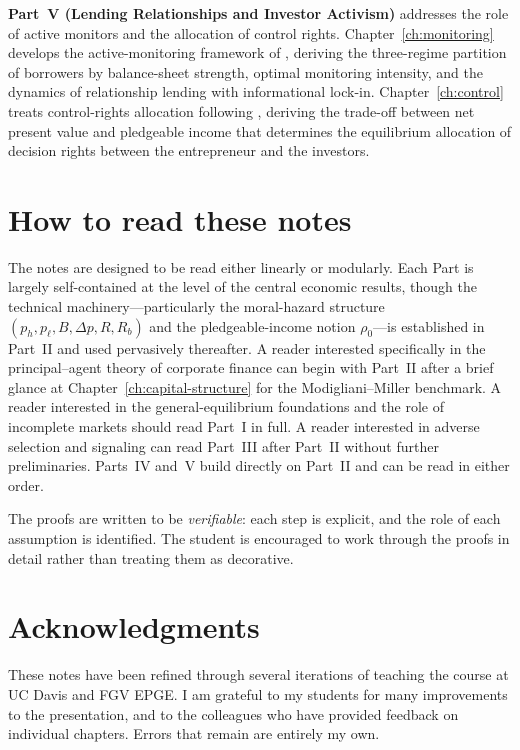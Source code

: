 \documentclass[11pt,a4paper,oneside]{book}
\theoremstyle{plain}
\theoremstyle{definition}
\theoremstyle{remark}
\numberwithin{equation}{chapter}
\begin{document}
\textbf{Part~V (Lending Relationships and Investor Activism)} addresses the role of active monitors and the allocation of control rights.
Chapter~\ref{ch:monitoring} develops the active-monitoring framework of \citet{HolmstromTirole1997}, deriving the three-regime partition of borrowers by balance-sheet strength, optimal monitoring intensity, and the dynamics of relationship lending with informational lock-in.
Chapter~\ref{ch:control} treats control-rights allocation following \citet{AghionBolton1992}, deriving the trade-off between net present value and pledgeable income that determines the equilibrium allocation of decision rights between the entrepreneur and the investors.

\section*{How to read these notes}

The notes are designed to be read either linearly or modularly.
Each Part is largely self-contained at the level of the central economic results, though the technical machinery---particularly the moral-hazard structure $(p_h, p_\ell, B, \Delta p, R, R_b)$ and the pledgeable-income notion $\rho_0$---is established in Part~II and used pervasively thereafter.
A reader interested specifically in the principal--agent theory of corporate finance can begin with Part~II after a brief glance at Chapter~\ref{ch:capital-structure} for the Modigliani--Miller benchmark.
A reader interested in the general-equilibrium foundations and the role of incomplete markets should read Part~I in full.
A reader interested in adverse selection and signaling can read Part~III after Part~II without further preliminaries.
Parts~IV and~V build directly on Part~II and can be read in either order.

The proofs are written to be \emph{verifiable}: each step is explicit, and the role of each assumption is identified.
The student is encouraged to work through the proofs in detail rather than treating them as decorative.

\section*{Acknowledgments}

These notes have been refined through several iterations of teaching the course at UC Davis and FGV EPGE.
I am grateful to my students for many improvements to the presentation, and to the colleagues who have provided feedback on individual chapters.
Errors that remain are entirely my own.
\end{document}
